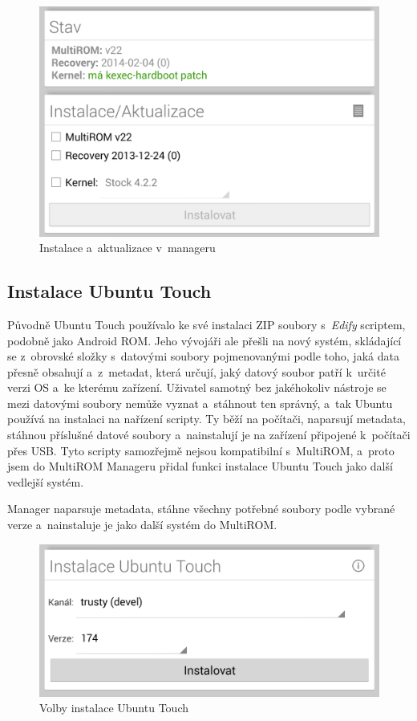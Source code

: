 \documentclass[12pt, a4paper, oneside]{article}
\newcommand{\It}{\textit}  %
\begin{document}
\begin{figure}[H]
\begin{center}
 \includegraphics[width=\textwidth]{img/mgr_install.png}
\caption{Instalace a~aktualizace v~manageru}
\end{center}
\end{figure}

\subsection{Instalace Ubuntu Touch}
Původně Ubuntu Touch používalo ke své instalaci ZIP soubory s~\It{Edify} scriptem, podobně jako Android ROM. Jeho vývojáři ale přešli na nový systém, skládající se z~obrovské složky s~datovými soubory pojmenovanými podle toho, jaká data přesně obsahují a~z~metadat, která určují, jaký datový soubor patří k~určité verzi OS a~ke kterému zařízení. Uživatel samotný bez jakéhokoliv nástroje se mezi datovými soubory nemůže vyznat a~stáhnout ten správný, a~tak Ubuntu používá na instalaci na nařízení scripty. Ty běží na počítači, naparsují metadata, stáhnou příslušné datové soubory a~nainstalují je na zařízení připojené k~počítači přes USB. Tyto scripty samozřejmě nejsou kompatibilní s~MultiROM, a~proto jsem do MultiROM Manageru přidal funkci instalace Ubuntu Touch jako další vedlejší systém.

Manager naparsuje metadata, stáhne všechny potřebné soubory podle vybrané verze a~nainstaluje je jako další systém do MultiROM.

\begin{figure}[H]
\begin{center}
 \includegraphics[width=\textwidth]{img/mgr_ubuntu.png}
\caption{Volby instalace Ubuntu Touch}
\end{center}
\end{figure}
\end{document}
